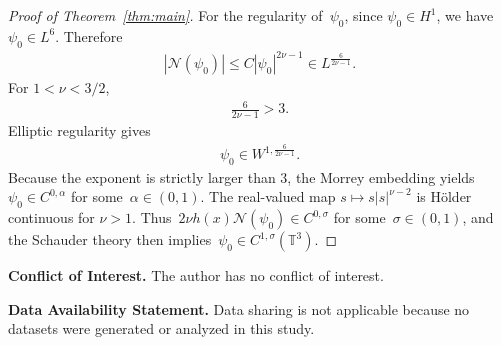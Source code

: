 \documentclass[11pt,final]{amsart}
\newcommand{\T}{\mathbb{T}}
\begin{document}
\begin{proof}[Proof of Theorem~\ref{thm:main}]
For the regularity of~$\psi_0$, since $\psi_0\in H^1$, we have $\psi_0\in L^6$. Therefore
\begin{align}
|\mathcal N(\psi_0)|
\le
C|\psi_0|^{2\nu-1}
\in
L^{\frac6{2\nu-1}}.
\end{align}
For $1<\nu<3/2$,
\begin{align}
\frac6{2\nu-1}>3.
\end{align}
Elliptic regularity gives
\begin{align}
\psi_0\in
W^{1,\frac6{2\nu-1}}.
\end{align}
Because the exponent is strictly larger than 3, the Morrey embedding yields~$\psi_0\in C^{0,\alpha}$ for some~$\alpha\in(0,1)$. 
The real-valued map $s\mapsto s|s|^{\nu-2}$ is H\"older continuous for $\nu>1$.
Thus~$2\nu h(x)\mathcal{N}(\psi_0)\in C^{0,\sigma}$
for some~$\sigma\in (0,1)$, and the Schauder theory then implies~$\psi_0\in C^{1,\sigma}(\T^3)$.
\end{proof}

















\textbf{Conflict of Interest.} The author has no conflict of interest. 


\textbf{Data Availability Statement.} Data sharing is not applicable because no datasets were generated or analyzed in this study.





\end{document}
